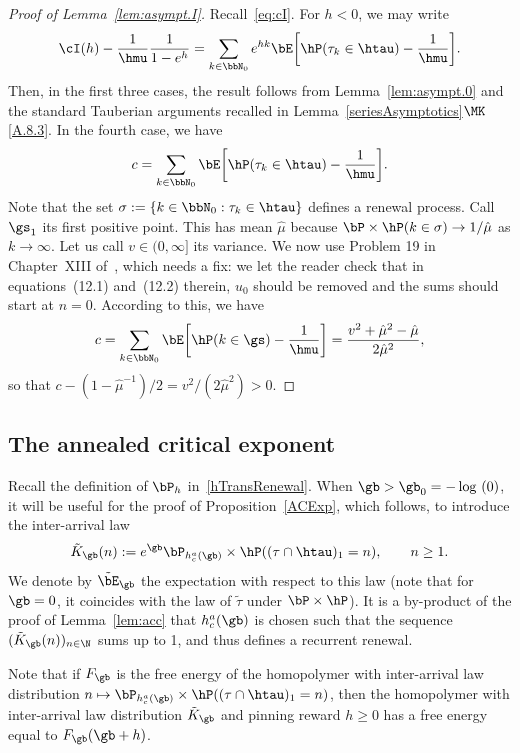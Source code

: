 \begin{proof}[Proof of Lemma~\ref{lem:asympt.I}]
Recall~\eqref{eq:cI}. For $h < 0$, we may write
\begin{equation}
\cI(h) - \frac{1}{\hmu} \frac{1}{1 - e^h} = \sum_{k\in\bbN_0} e^{h k} \bE \bigg[\hP(\tau_k \in \htau) - \frac{1}{\hmu} \bigg].
\end{equation}
Then, in the first three cases, the result follows from Lemma~\ref{lem:asympt.0} and the standard Tauberian arguments recalled in Lemma~\ref{seriesAsymptotics}$\MK$\eqref{A.8.3}. In the fourth case, we have
\[
c=\sum_{k\in\bbN_0} \bE \bigg[\hP(\tau_k \in \htau) - \frac{1}{\hmu} \bigg].
\]
Note that the set $\sigma:=\{k\in \bbN_0: \tau_k\in \htau\}$ defines a renewal process. Call $\gs_1$ its first positive point. This has mean $\hat \mu$ because $\bP\times \hP(k\in \sigma)\to 1/\hat \mu$ as $k\to\infty$. Let us call $v\in(0, \infty]$ its variance. We now use Problem 19 in Chapter~XIII of~\cite{Feller68}, which needs a fix: we let the reader check that in equations~(12.1) and~(12.2) therein, $u_0$ should be removed and the sums should start at $n=0$. According to this, we have
\[
c=\sum_{k\in\bbN_0} \bE \bigg[\hP(k \in \gs) - \frac{1}{\hmu} \bigg]=\frac{v^2+\hat \mu^2-\hat \mu}{2\hat \mu^2},
\]
so that $c-(1-\hat \mu^{-1})/2=v^2/(2\hat\mu^2)>0$.
\end{proof}

\subsection{The annealed critical exponent} \label{sec3.3}

Recall the definition of $\bP_h$ in~\eqref{hTransRenewal}. When $\gb > \gb_0 = - \log~(0)$, it will be useful for the proof of Proposition~\ref{ACExp}, which follows, to introduce the inter-arrival law
\begin{equation}\label{tildeRenewal}
\tilde K_\gb(n) := e^\gb \bP_{h_c^a(\gb)} \times \hP((\tau \cap \htau)_1 = n), \qquad n \geq 1.
\end{equation}
We denote by $\tilde \bE_\gb$ the expectation with respect to this law (note that for $\gb=0$, it coincides with the law of $\tilde\tau$ under $\bP \times \hP$). It is a by-product of the proof of Lemma~\ref{lem:acc} that $h_c^a(\gb)$ is chosen such that the sequence $(\tilde K_\gb(n))_{n\in\N}$ sums up to 1, and thus defines a recurrent renewal.

\begin{remark}\label{rmk:freeenergyhomopol}
Note that if $F_\gb$ is the free energy of the homopolymer with inter-arrival law distribution $n \mapsto \bP_{h_c^a(\gb)} \times \hP((\tau \cap \htau)_1 = n)$, then the homopolymer with inter-arrival law distribution $\tilde K_\gb$ and pinning reward $h \geq 0$ has a free energy equal to $F_\gb(\gb+h)$.
\end{remark}

